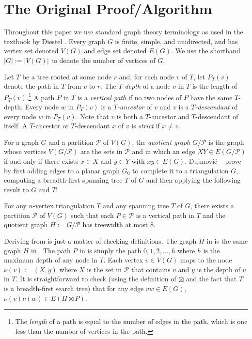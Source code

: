 \documentclass[kpfonts]{patmorin}
\begin{document}
\section{The Original Proof/Algorithm}

Throughout this paper we use standard graph theory terminology as used in the textbook by Diestel \cite{diestel:graph}.  Every graph $G$ is finite, simple, and unidirected, and has vertex set denoted $V(G)$ and edge set denoted $E(G)$. We use the shorthand $|G|:=|V(G)|$ to denote the number of vertices of $G$.

Let $T$ be a tree rooted at some node $r$ and, for each node $v$ of $T$, let $P_T(v)$ denote the path in $T$ from $v$ to $r$.  The \emph{$T$-depth} of a node $v$ in $T$ is the length of $P_T(v)$.\footnote{The \emph{length} of a path is equal to the number of edges in the path, which is one less than the number of vertices in the path.}  A path $P$ in $T$ is a \emph{vertical path} if no two nodes of $P$ have the same $T$-depth.  Every node $w$ in $P_T(v)$ is a \emph{$T$-ancestor} of $v$ and $v$ is a \emph{$T$-descendant} of every node $w$ in $P_T(v)$.  Note that $v$ is both a $T$-ancestor and $T$-descendant of itself.  A $T$-ancestor or $T$-descendant $x$ of $v$ is \emph{strict} if $x\neq v$.

For a graph $G$ and a partition $\mathcal{P}$ of $V(G)$, the \emph{quotient graph} $G/\mathcal{P}$ is the graph whose vertices $V(G/\mathcal{P})$ are the sets in $\mathcal{P}$ and in which an edge $XY\in E(G/\mathcal{P})$ if and only if there exists $x\in X$ and $y\in Y$ with $xy\in E(G)$.  Dujmović \etal\  \cite{dujmovic.joret.ea:planar} prove  by first adding edges to a planar graph $G_0$ to complete it to a triangulation $G$, computing a breadth-first spanning tree $T$ of $G$ and then applying the following result to $G$ and $T$:

\begin{thm}
  For any $n$-vertex triangulation $T$ and any spanning tree $T$ of $G$, there exists a partition $\mathcal{P}$ of $V(G)$ such that each $P\in\mathcal{P}$ is a vertical path in $T$ and the quotient graph $H:=G/\mathcal{P}$ has treewidth at most $8$.
\end{thm}

Deriving  from  is just a matter of checking definitions.  The graph $H$ in  is the same graph $H$ in . The path $P$ in  is simply the path $0,1,2,\ldots,h$ where $h$ is the maximum depth of any node in $T$.  Each vertex $v\in V(G)$ maps to the node $\nu(v):=(X,y)$ where $X$ is the set in $\mathcal{P}$ that contains $v$ and $y$ is the depth of $v$ in $T$.  It is straightforward to check (using the definition of $\boxtimes$ and the fact that $T$ is a breadth-first search tree) that for any  edge $vw\in E(G)$, $\nu(v)\nu(w)\in E(H\boxtimes P)$.
\end{document}
